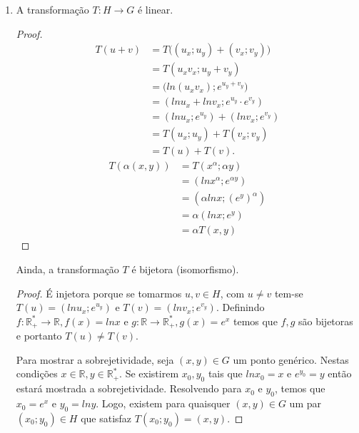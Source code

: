 \documentclass[english,ngerman,parskip=half]{scrartcl}
\begin{document}
\begin{enumerate}
    \item
        A transformação $T: H \rightarrow G $ é linear.

        \begin{proof}
        \begin{equation}
            \begin{split}
            T(u+v) &= T\big( (u_x ; u_y) + (v_x ; v_y) \big) \\
            &= T( u_x v_x ; u_y + v_y ) \\
            &= \big( ln(u_x v_x) ; e^{u_y + v_y} \big) \\
            &= (ln u_x + ln v_x ; e^{u_y} \cdot e^{v_y}) \\
            &= (ln u_x ; e^{u_y}) + (ln v_x ; e^{v_y}) \\
            &= T(u_x ; u_y) + T(v_x ; v_y) \\
            &= T(u) + T(v).
            \end{split}
        \end{equation}
        \begin{equation}
            \begin{split}
            T(\alpha (x,y)) &= T(x^\alpha ; \alpha y) \\
            &= (ln x^\alpha ; e^{\alpha y}) \\
            &= (\alpha ln x; (e^y)^\alpha) \\
            &= \alpha (ln x ; e^y) \\
            &= \alpha T(x,y)
            \end{split}
        \end{equation}
        \end{proof}

        Ainda, a transformação $T$ é bijetora (isomorfismo).
        
        \begin{proof}
            É injetora porque se tomarmos $u,v \in H$, com $u \neq v$
            tem-se $T(u) = (ln u_x ; e^{u_y})$ e $T(v) = (ln v_x ; e^{v_y})$. 
            Definindo $f: \mathbb{R}^*_+ \rightarrow \mathbb{R}, f(x) = ln x$
            e $g: \mathbb{R} \rightarrow \mathbb{R}^*_+, g(x) = e^x$ temos que $f,g$ são bijetoras e portanto $T(u) \neq T(v)$.
    
            Para mostrar a sobrejetividade, seja $(x,y) \in G$ um ponto genérico. Nestas condições $x \in \mathbb{R}, y \in \mathbb{R}^*_+$.
            Se existirem $x_0, y_0$ tais que $ln x_0 = x$ e $e^{y_0} = y$ então estará mostrada a sobrejetividade.
            Resolvendo para $x_0$ e $y_0$, temos que $x_0 = e^x$ e $y_0 = ln y$. Logo, existem para quaisquer $(x,y) \in G$ um par $(x_0; y_0) \in H$ que satisfaz $T(x_0;y_0) = (x, y)$.
        \end{proof}


\end{enumerate}
\end{document}
